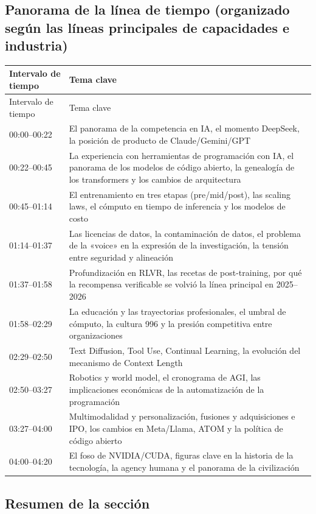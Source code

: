 \documentclass[a4paper]{article}
\begin{document}
\subsection{Panorama de la línea de tiempo (organizado según las líneas principales de capacidades e industria)}

\begin{longtable}{p{}p{}}
\toprule
Intervalo de tiempo & Tema clave \\
\midrule
\endfirsthead
\toprule
Intervalo de tiempo & Tema clave \\
\midrule
\endhead
00:00--00:22 & El panorama de la competencia en IA, el momento DeepSeek, la posición de producto de Claude/Gemini/GPT \\
00:22--00:45 & La experiencia con herramientas de programación con IA, el panorama de los modelos de código abierto, la genealogía de los transformers y los cambios de arquitectura \\
00:45--01:14 & El entrenamiento en tres etapas (pre/mid/post), las scaling laws, el cómputo en tiempo de inferencia y los modelos de costo \\
01:14--01:37 & Las licencias de datos, la contaminación de datos, el problema de la «voice» en la expresión de la investigación, la tensión entre seguridad y alineación \\
01:37--01:58 & Profundización en RLVR, las recetas de post-training, por qué la recompensa verificable se volvió la línea principal en 2025--2026 \\
01:58--02:29 & La educación y las trayectorias profesionales, el umbral de cómputo, la cultura 996 y la presión competitiva entre organizaciones \\
02:29--02:50 & Text Diffusion, Tool Use, Continual Learning, la evolución del mecanismo de Context Length \\
02:50--03:27 & Robotics y world model, el cronograma de AGI, las implicaciones económicas de la automatización de la programación \\
03:27--04:00 & Multimodalidad y personalización, fusiones y adquisiciones e IPO, los cambios en Meta/Llama, ATOM y la política de código abierto \\
04:00--04:20 & El foso de NVIDIA/CUDA, figuras clave en la historia de la tecnología, la agency humana y el panorama de la civilización \\
\bottomrule
\end{longtable}

\subsection{Resumen de la sección}
\end{document}
